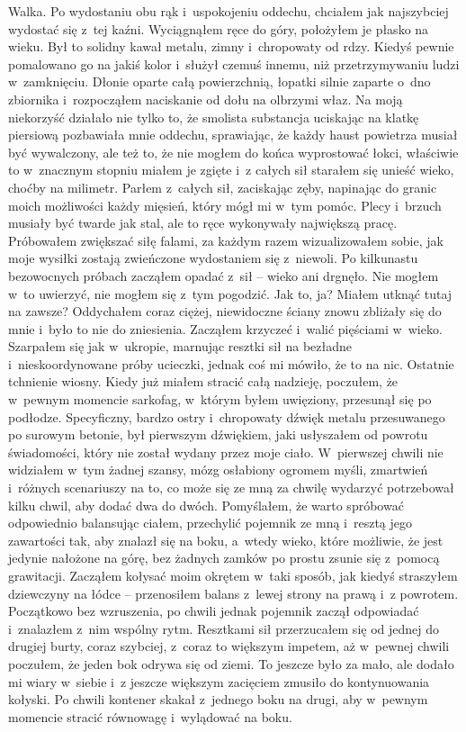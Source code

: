 Walka. Po wydostaniu obu rąk i~uspokojeniu oddechu, chciałem jak najszybciej wydostać się z~tej kaźni. Wyciągnąłem ręce do góry, położyłem je płasko na wieku. Był to solidny kawał metalu, zimny i~chropowaty od rdzy. Kiedyś pewnie pomalowano go na jakiś kolor i~służył czemuś innemu, niż przetrzymywaniu ludzi w~zamknięciu. Dłonie oparte całą powierzchnią, łopatki silnie zaparte o~dno zbiornika i~rozpocząłem naciskanie od dołu na olbrzymi właz. Na moją niekorzyść działało nie tylko to, że smolista substancja uciskając na klatkę piersiową pozbawiała mnie oddechu, sprawiając, że każdy haust powietrza musiał być wywalczony, ale też to, że nie mogłem do końca wyprostować łokci, właściwie to w~znacznym stopniu miałem je zgięte i~z całych sił starałem się unieść wieko, choćby na milimetr. Parłem z~całych sił, zaciskając zęby, napinając do granic moich możliwości każdy mięsień, który mógł mi w~tym pomóc. Plecy i~brzuch musiały być twarde jak stal, ale to ręce wykonywały największą pracę. Próbowałem zwiększać siłę falami, za każdym razem wizualizowałem sobie, jak moje wysiłki zostają zwieńczone wydostaniem się z~niewoli. Po kilkunastu bezowocnych próbach zacząłem opadać z~sił -- wieko ani drgnęło. Nie mogłem w~to uwierzyć, nie mogłem się z~tym pogodzić. Jak to, ja? Miałem utknąć tutaj na zawsze? Oddychałem coraz ciężej, niewidoczne ściany znowu zbliżały się do mnie i~było to nie do zniesienia. Zacząłem krzyczeć i~walić pięściami w~wieko. Szarpałem się jak w~ukropie, marnując resztki sił na bezładne i~nieskoordynowane próby ucieczki, jednak coś mi mówiło, że to na nic. Ostatnie tchnienie wiosny. Kiedy już miałem stracić całą nadzieję, poczułem, że w~pewnym momencie sarkofag, w~którym byłem uwięziony, przesunął się po podłodze. Specyficzny, bardzo ostry i~chropowaty dźwięk metalu przesuwanego po surowym betonie, był pierwszym dźwiękiem, jaki usłyszałem od powrotu świadomości, który nie został wydany przez moje ciało. W~pierwszej chwili nie widziałem w~tym żadnej szansy, mózg osłabiony ogromem myśli, zmartwień i~różnych scenariuszy na to, co może się ze mną za chwilę wydarzyć potrzebował kilku chwil, aby dodać dwa do dwóch. Pomyślałem, że warto spróbować odpowiednio balansując ciałem, przechylić pojemnik ze mną i~resztą jego zawartości tak, aby znalazł się na boku, a~wtedy wieko, które możliwie, że jest jedynie nałożone na górę, bez żadnych zamków po prostu zsunie się z~pomocą grawitacji. Zacząłem kołysać moim okrętem w~taki sposób, jak kiedyś straszyłem dziewczyny na łódce -- przenosiłem balans z~lewej strony na prawą i~z powrotem. Początkowo bez wzruszenia, po chwili jednak pojemnik  zaczął odpowiadać i~znalazłem z~nim wspólny rytm. Resztkami sił przerzucałem się od jednej do drugiej burty, coraz szybciej, z~coraz to większym impetem, aż w~pewnej chwili poczułem, że jeden bok odrywa się od ziemi. To jeszcze było za mało, ale dodało mi wiary w~siebie i~z jeszcze większym zacięciem zmusiło do kontynuowania kołyski. Po chwili kontener skakał z~jednego boku na drugi, aby w~pewnym momencie stracić równowagę i~wylądować na boku. 

